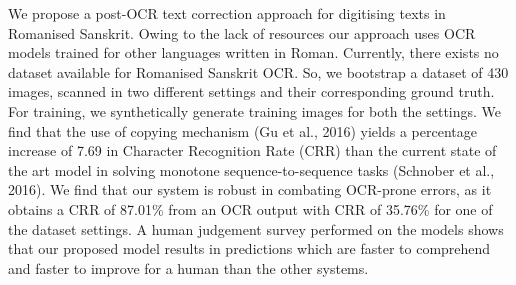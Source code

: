 We propose a post-OCR text correction approach for digitising texts in Romanised Sanskrit. Owing to the lack of resources our approach uses OCR models trained for other languages written in Roman. Currently, there exists no dataset available for Romanised Sanskrit OCR. So, we bootstrap a dataset of 430 images, scanned in two different settings and their corresponding ground truth. For training, we synthetically generate training images for both the settings. We find that the use of copying mechanism (Gu et al., 2016) yields a percentage increase of 7.69 in Character Recognition Rate (CRR) than the current state of the art model in solving monotone sequence-to-sequence tasks (Schnober et al., 2016). We find that our system is robust in combating OCR-prone errors, as it obtains a CRR of 87.01\% from an OCR output with CRR of 35.76\% for one of the dataset settings. A human judgement survey performed on the models shows that our proposed model results in predictions which are faster to comprehend and faster to improve for a human than the other systems.
